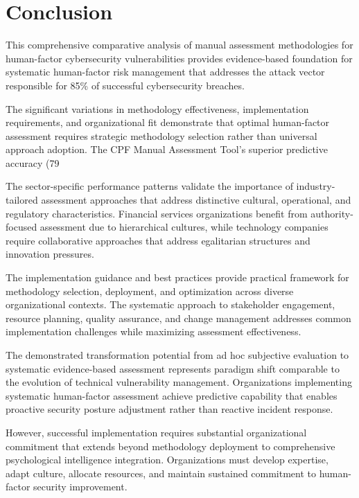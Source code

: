\documentclass[10pt, twocolumn]{article}
\begin{document}
\section{Conclusion}

This comprehensive comparative analysis of manual assessment methodologies for human-factor cybersecurity vulnerabilities provides evidence-based foundation for systematic human-factor risk management that addresses the attack vector responsible for 85\% of successful cybersecurity breaches.

The significant variations in methodology effectiveness, implementation requirements, and organizational fit demonstrate that optimal human-factor assessment requires strategic methodology selection rather than universal approach adoption. The CPF Manual Assessment Tool's superior predictive accuracy (79%

The sector-specific performance patterns validate the importance of industry-tailored assessment approaches that address distinctive cultural, operational, and regulatory characteristics. Financial services organizations benefit from authority-focused assessment due to hierarchical cultures, while technology companies require collaborative approaches that address egalitarian structures and innovation pressures.

The implementation guidance and best practices provide practical framework for methodology selection, deployment, and optimization across diverse organizational contexts. The systematic approach to stakeholder engagement, resource planning, quality assurance, and change management addresses common implementation challenges while maximizing assessment effectiveness.

The demonstrated transformation potential from ad hoc subjective evaluation to systematic evidence-based assessment represents paradigm shift comparable to the evolution of technical vulnerability management. Organizations implementing systematic human-factor assessment achieve predictive capability that enables proactive security posture adjustment rather than reactive incident response.

However, successful implementation requires substantial organizational commitment that extends beyond methodology deployment to comprehensive psychological intelligence integration. Organizations must develop expertise, adapt culture, allocate resources, and maintain sustained commitment to human-factor security improvement.
\end{document}
